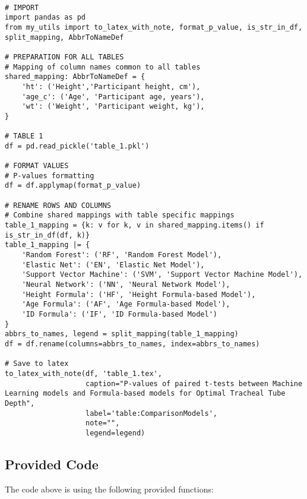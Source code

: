 \documentclass[11pt]{article}
\begin{document}
\begin{verbatim}

# IMPORT
import pandas as pd
from my_utils import to_latex_with_note, format_p_value, is_str_in_df, split_mapping, AbbrToNameDef

# PREPARATION FOR ALL TABLES
# Mapping of column names common to all tables
shared_mapping: AbbrToNameDef = {
    'ht': ('Height','Participant height, cm'),
    'age_c': ('Age', 'Participant age, years'),
    'wt': ('Weight', 'Participant weight, kg'),
}

# TABLE 1
df = pd.read_pickle('table_1.pkl')

# FORMAT VALUES
# P-values formatting
df = df.applymap(format_p_value)

# RENAME ROWS AND COLUMNS
# Combine shared mappings with table specific mappings
table_1_mapping = {k: v for k, v in shared_mapping.items() if is_str_in_df(df, k)}
table_1_mapping |= {
    'Random Forest': ('RF', 'Random Forest Model'),
    'Elastic Net': ('EN', 'Elastic Net Model'),
    'Support Vector Machine': ('SVM', 'Support Vector Machine Model'),
    'Neural Network': ('NN', 'Neural Network Model'),
    'Height Formula': ('HF', 'Height Formula-based Model'),
    'Age Formula': ('AF', 'Age Formula-based Model'),
    'ID Formula': ('IF', 'ID Formula-based Model')
}
abbrs_to_names, legend = split_mapping(table_1_mapping)
df = df.rename(columns=abbrs_to_names, index=abbrs_to_names)

# Save to latex
to_latex_with_note(df, 'table_1.tex',
                   caption="P-values of paired t-tests between Machine Learning models and Formula-based models for Optimal Tracheal Tube Depth", 
                   label='table:ComparisonModels',
                   note="",
                   legend=legend)

\end{verbatim}

\subsection{Provided Code}
The code above is using the following provided functions:
\end{document}
